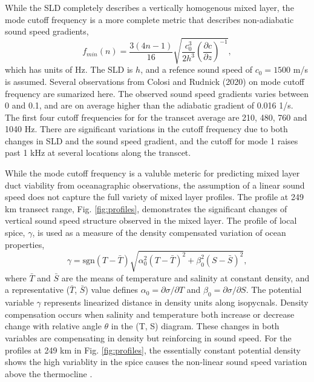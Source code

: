 \documentclass[preprint,NumberedRefs]{JASA}
\begin{document}
While the SLD completely describes a vertically homogenous mixed layer, the mode cutoff frequency\citep{Urick1982Prop} is a more complete metric that describes non-adiabatic sound speed gradients,
\begin{equation}
    f_{min}(n) = \frac{3(4n-1)}{16} \sqrt{\frac{c_0^3}{2h^3} \left( \frac{\partial c}{\partial z} \right) ^ {-1}},
    \label{eq:f_cutoff}
\end{equation}
which has units of Hz. The SLD is $h$, and a refence sound speed of $c_0 = 1500$ m/s is assumed. Several observations from Colosi and Rudnick (2020)\cite{colosi2020observations} on mode cutoff frequency are sumarized here. The observed sound speed gradients varies between 0 and 0.1, and are on average higher than the adiabatic gradient of 0.016 1/s. The first four cutoff frequencies for for the transcet average are 210, 480, 760 and 1040 Hz. There are significant variations in the cutoff frequency due to both changes in SLD and the sound speed gradient, and the cutoff for mode 1 raises past 1 kHz at several locations along the transcet.

While the mode cutoff frequency is a valuble meteric for predicting mixed layer duct viability from oceanagraphic observations, the assumption of a linear sound speed does not capture the full variety of mixed layer profiles. The profile at 249 km transect range, Fig. \ref{fig:profiles}, demonstrates the significant changes of vertical sound speed structure observed in the mixed layer. The profile of local spice, $\gamma$, is used as a measure of the density compensated variation \citep{klymak2015spice} of ocean properties,
\begin{equation}
    \gamma=\textrm{sgn}(T-\bar{T}) \sqrt{\alpha_0^2(T-\bar{T})^2 +\beta_0^2(S-\bar{S})^2},
    \label{eq:gamma}
\end{equation}
where $\bar{T}$ and $\bar{S}$ are the means of temperature and salinity at constant density, and a representative ($\bar{T}$, $\bar{S}$) value defines $\alpha_0=\partial \sigma / \partial T$ and $\beta_0=\partial \sigma / \partial S$. The potential variable $\gamma$ represents linearized distance in density units along isopycnals. Density compensation occurs when salinity and temperature both increase or decrease change with relative angle $\theta$ in the (T, S) diagram. These changes in both variables are compensating in density but reinforcing in sound speed. For the profiles at 249 km in Fig. \ref{fig:profiles}, the essentially constant potential density shows the high variablity in the spice causes the non-linear sound speed variation above the thermocline .
\end{document}
